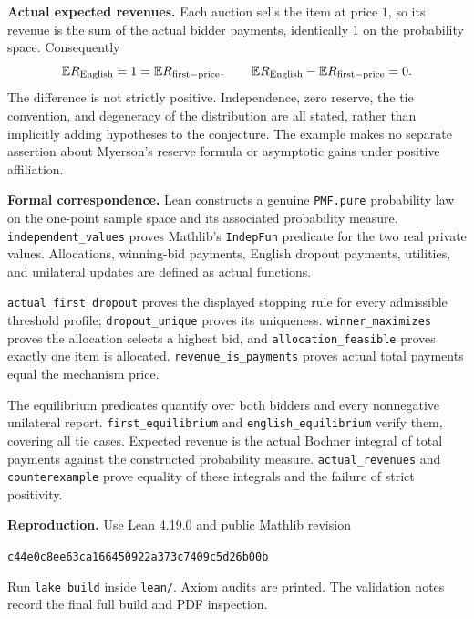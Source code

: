 \documentclass[11pt]{article}
\begin{document}
\textbf{Actual expected revenues.}
Each auction sells the item at price $1$, so its revenue is the sum of
the actual bidder payments, identically $1$ on the probability space.
Consequently
\[
 \mathbb E R_{\rm English}=1=\mathbb E R_{\rm first-price},
 \qquad
 \mathbb E R_{\rm English}-\mathbb E R_{\rm first-price}=0.
\]
The difference is not strictly positive. Independence, zero reserve,
the tie convention, and degeneracy of the distribution are all stated,
rather than implicitly adding hypotheses to the conjecture. The example
makes no separate assertion about Myerson's reserve formula or
asymptotic gains under positive affiliation.

\textbf{Formal correspondence.}
Lean constructs a genuine \texttt{PMF.pure} probability law on the
one-point sample space and its associated probability measure.
\texttt{independent\_values} proves Mathlib's \texttt{IndepFun} predicate
for the two real private values. Allocations, winning-bid payments,
English dropout payments, utilities, and unilateral updates are defined
as actual functions.

\texttt{actual\_first\_dropout} proves the displayed stopping rule for
every admissible threshold profile; \texttt{dropout\_unique} proves
its uniqueness. \texttt{winner\_maximizes} proves the allocation selects
a highest bid, and \texttt{allocation\_feasible} proves exactly one
item is allocated. \texttt{revenue\_is\_payments} proves actual total
payments equal the mechanism price.

The equilibrium predicates quantify over both bidders and every
nonnegative unilateral report. \texttt{first\_equilibrium} and
\texttt{english\_equilibrium} verify them, covering all tie cases.
Expected revenue is the actual Bochner integral of total payments
against the constructed probability measure.
\texttt{actual\_revenues} and \texttt{counterexample} prove equality
of these integrals and the failure of strict positivity.

\textbf{Reproduction.}
Use Lean 4.19.0 and public Mathlib revision
\begin{center}\small\texttt{c44e0c8ee63ca166450922a373c7409c5d26b00b}\end{center}
Run \texttt{lake build} inside \texttt{lean/}. Axiom audits are printed.
The validation notes record the final full build and PDF inspection.
\end{document}
